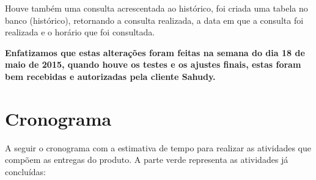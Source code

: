 \documentclass[a4paper,12pt]{article}
\begin{document}
Houve também uma consulta acrescentada ao histórico, foi criada uma tabela no banco (histórico), retornando a consulta realizada, a data em que a consulta foi realizada e o horário que foi consultada.

\textbf{Enfatizamos que estas alterações foram feitas na semana do dia 18 de maio de 2015, quando houve os testes e os ajustes finais, estas foram bem recebidas e autorizadas pela cliente Sahudy.}







\newpage
\section{Cronograma}

A seguir o cronograma com a estimativa de tempo para realizar as atividades que compõem as entregas do produto. A parte verde representa as atividades já concluídas:\\

\end{document}
